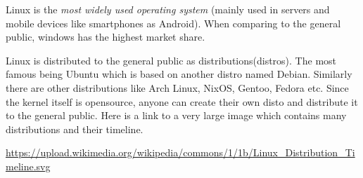 Linux is the \emph{most widely used operating system} (mainly used in servers and mobile devices like smartphones as Android). When comparing to the general public, windows has the highest market share.

Linux is distributed to the general public as distributions(distros). The most famous being Ubuntu which is based on another distro named Debian. Similarly there are other distributions like Arch Linux, NixOS, Gentoo, Fedora etc. Since the kernel itself is opensource, anyone can create their own disto and distribute it to the general public. Here is a link to a very large image which contains many distributions and their timeline.

\url{https://upload.wikimedia.org/wikipedia/commons/1/1b/Linux_Distribution_Timeline.svg}
